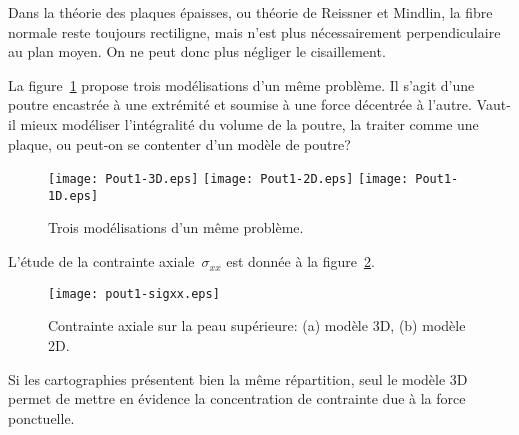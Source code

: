 \begin{histoire}
\medskip
Dans la théorie des plaques épaisses, ou théorie de Reissner et Mindlin, la fibre normale reste toujours rectiligne, mais n'est plus nécessairement perpendiculaire au plan moyen. On ne peut donc plus négliger le cisaillement.
\end{histoire}

\bigskip
La figure~\ref{Pout1} propose trois modélisations d'un même problème. Il s'agit d'une poutre encastrée à une extrémité et soumise à une force décentrée à l'autre. Vaut-il mieux modéliser l'intégralité du volume de la poutre, la traiter comme une plaque, ou peut-on se contenter d'un modèle de poutre?
\begin{figure}[ht]
\centering
\texttt{[image: Pout1-3D.eps]} \hfill
\texttt{[image: Pout1-2D.eps]} \hfill
\texttt{[image: Pout1-1D.eps]}
\caption{\label{Pout1} Trois modélisations d'un même problème.}
\end{figure}

\medskip
L'étude de la contrainte axiale~$\sigma_{xx}$ est donnée à la figure~\ref{Pout1-sigxx}.
\begin{figure}[ht]
\centering
\texttt{[image: pout1-sigxx.eps]}
\caption{\label{Pout1-sigxx} Contrainte axiale sur la peau supérieure: (a) modèle 3D,
(b) modèle 2D.}
\end{figure}
Si les cartographies présentent bien la même répartition, seul le modèle 3D permet de mettre en évidence la concentration de contrainte due à la force ponctuelle.

